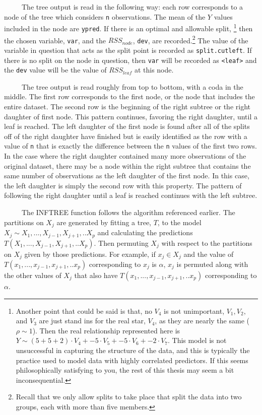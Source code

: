 \documentclass[12pt,twoside]{reedthesis}
\begin{document}
  ~~~~~The tree output is read in the following way: each row corresponds
  to a node of the tree which considers \texttt{n} observations. The mean
  of the \(Y\) values included in the node are \texttt{ypred}. If there is
  an optimal and allowable split, \footnote{Another point that could be
    said is that, no \(V_4\) is not unimportant, \(V_1, V_2,\) and \(V_3\)
    are just stand ins for the real star, \(V_4\), as they are nearly the
    same (\(\rho \sim 1\)). Then the real relationship represented here is
    \(Y \sim (5 + 5 + 2) \cdot V_4 + -5 \cdot V_5 + -5 \cdot V_6 + -2 \cdot V_7\).
    This model is not unsuccessful in capturing the structure of the data,
    and this is typically the practice used to model data with highly
    correlated predictors. If this seems philosophically satisfying to
    you, the rest of this thesis may seem a bit inconsequential.} then the
  chosen variable, \texttt{var}, and the \(RSS_{node}\), \texttt{dev}, are
  recorded.\footnote{Recall that we only allow splits to take place that
    split the data into two groups, each with more than five members.} The
  value of the variable in question that acts as the split point is
  recorded as \texttt{split.cutleft}. If there is no split on the node in
  question, then \texttt{var} will be recorded as
  \texttt{\textless{}leaf\textgreater{}} and the \texttt{dev} value will
  be the value of \(RSS_{leaf}\) at this node.
  
  ~~~~~The tree output is read roughly from top to bottom, with a coda in
  the middle. The first row corresponds to the first node, or the node
  that includes the entire dataset. The second row is the beginning of the
  right subtree or the right daughter of first node. This pattern
  continues, favoring the right daughter, until a leaf is reached. The
  left daughter of the first node is found after all of the splits off of
  the right daughter have finished but is easily identified as the row
  with a value of \texttt{n} that is exactly the difference between the
  \texttt{n} values of the first two rows. In the case where the right
  daughter contained many more observations of the original dataset, there
  may be a node within the right subtree that contains the same number of
  observations as the left daughter of the first node. In this case, the
  left daughter is simply the second row with this property. The pattern
  of following the right daughter until a leaf is reached continues with
  the left subtree.
  
  ~~~~~The INFTREE function follows the algorithm referenced earlier. The
  partitions on \(X_j\) are generated by fitting a tree, \(T\), to the
  model \(X_j \sim X_1,..., X_{j-1}, X_{j+1},..X_p\) and calculating the
  predictions \(T(X_1,..., X_{j-1}, X_{j+1},..X_p)\). Then permuting
  \(X_j\) with respect to the partitions on \(X_j\) given by those
  predictions. For example, if \(x_j \in X_j\) and the value of
  \(T(x_1,..., x_{j-1}, x_{j+1},..x_p)\) corresponding to \(x_j\) is
  \(\alpha\), \(x_j\) is permuted along with the other values of \(X_j\)
  that also have \(T(x_1,..., x_{j-1}, x_{j+1},..x_p)\) corresponding to
  \(\alpha\).
  
\end{document}
